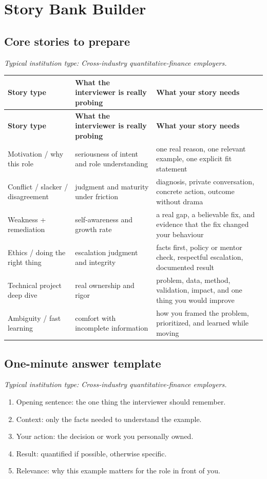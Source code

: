\documentclass[11pt,letterpaper,openany]{book}
\newcommand{\RoleProfile}[2]{%
  \subsection{#1}%
  \noindent\textit{Typical institution type: #2.}\par
}
\begin{document}
\section{Story Bank Builder}
\RoleProfile{Core stories to prepare}{Cross-industry quantitative-finance employers}
\begin{longtable}{@{}p{}p{}p{}@{}}
\toprule
\textbf{Story type} & \textbf{What the interviewer is really probing} & \textbf{What your story needs}\\
\midrule
\endfirsthead
\toprule
\textbf{Story type} & \textbf{What the interviewer is really probing} & \textbf{What your story needs}\\
\midrule
\endhead
\bottomrule
\endfoot
Motivation / why this role & seriousness of intent and role understanding & one real reason, one relevant example, one explicit fit statement\\
Conflict / slacker / disagreement & judgment and maturity under friction & diagnosis, private conversation, concrete action, outcome without drama\\
Weakness + remediation & self-awareness and growth rate & a real gap, a believable fix, and evidence that the fix changed your behaviour\\
Ethics / doing the right thing & escalation judgment and integrity & facts first, policy or mentor check, respectful escalation, documented result\\
Technical project deep dive & real ownership and rigor & problem, data, method, validation, impact, and one thing you would improve\\
Ambiguity / fast learning & comfort with incomplete information & how you framed the problem, prioritized, and learned while moving\\
\end{longtable}

\RoleProfile{One-minute answer template}{Cross-industry quantitative-finance employers}
\begin{enumerate}
  \item Opening sentence: the one thing the interviewer should remember.
  \item Context: only the facts needed to understand the example.
  \item Your action: the decision or work you personally owned.
  \item Result: quantified if possible, otherwise specific.
  \item Relevance: why this example matters for the role in front of you.
\end{enumerate}
\end{document}
